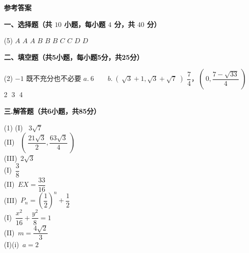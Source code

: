 \documentclass[11pt,a4paper]{ctexart}
\newcommand{\sectiontitle}[1]{
  \par\noindent\textbf{#1}\par%
  }
\newcounter{chapPage}
\begin{document}
\clearpage %
\setcounter{enumi}{0}   %
{} %
\setcounter{chapPage}{1} %

\begin{center} 
    {\LARGE \textbf{参考答案}}\\[1em]
\end{center}

\sectiontitle{一、选择题（共 $10$ 小题，每小题 $4$ 分，共 $40$ 分）}

    \begin{tasks}[label=(\arabic*), after-item-skip=0.6em,start=1] (5)
        \task $A$ 
        \task $A$
        \task $A$
        \task $B$        
        \task $B$
        \task $B$        
        \task $C$
        \task $C$        
        \task $D$
        \task $D$
    \end{tasks}

\sectiontitle{二、填空题（共5小题，每小题5分，共25分）}

    \begin{tasks}[label=(\arabic*), after-item-skip=0.6em,start=11] (2)
        \task $-1$ 
        \task 既不充分也不必要
        \task $a.\ 6$\ \ \ \ $b.\ (\ \sqrt{3}+1,\sqrt{3}+\sqrt{7}\ )$
        \task $\dfrac{7}{4}$，$(\ 0,\dfrac{7-\sqrt{33}}{4}\ )$  
        \task \textcircled{2} \textcircled{3} \textcircled{4}
        \end{tasks}

\sectiontitle{三.解答题（共6小题，共85分）}

    \begin{tasks}[label=(\arabic*), after-item-skip=0.6em,start=16] (1)
        \task 
        (I) \ $3 \sqrt{7}$\\[0.6em]
        (II) \ $(\ \dfrac{21 \sqrt{3}}{2},\dfrac{63 \sqrt{3}}{4}\ )$ \\

        \task
        (III)\ $2 \sqrt{3}$\\

        \task
        (I)\ $\dfrac{3}{8}$ \\[0.6em]
        (II)\ $EX=\dfrac{33}{16}$\\[0.6EM]
        (III)\ $P_n=(\dfrac{1}{2})^n+\dfrac{1}{2}$\\

        \task
        (I)\ $\dfrac{x^2}{16}+\dfrac{y^2}{8}= 1$ \\[0.6em]
        (II)\ $m=\dfrac{4 \sqrt{2}}{3}$\\
        
        \task
        (I)(i)\ $a=2$\\[0.6em]
    
    \end{tasks}
\end{document}
